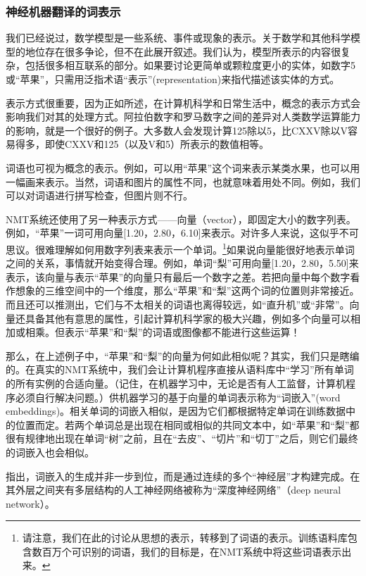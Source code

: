 \documentclass[output=paper]{langscibook}
\begin{document}
\subsubsection{神经机器翻译的词表示}\largerpage
我们已经说过，数学模型是一些系统、事件或现象的表示。关于数学和其他科学模型的地位存在很多争论，但不在此展开叙述。我们认为，模型所表示的内容很复杂，包括很多相互联系的部分。如果要讨论更简单或颗粒度更小的实体，如数字5或“苹果”，只需用泛指术语“表示”(representation)来指代描述该实体的方式。

表示方式很重要，因为正如\citet{deeplearningbook}所述，在计算机科学和日常生活中，概念的表示方式会影响我们对其的处理方式。阿拉伯数字和罗马数字之间的差异对人类数学运算能力的影响，就是一个很好的例子。大多数人会发现计算125除以5，比CXXV除以V容易得多，即使CXXV和125（以及V和5）所表示的数值相等。

词语也可视为概念的表示。例如，可以用“苹果”这个词来表示某类水果，也可以用一幅画来表示。当然，词语和图片的属性不同，也就意味着用处不同。例如，我们可以对词语进行拼写检查，但图片则不行。

NMT系统还使用了另一种表示方式——向量（vector），即固定大小的数字列表。例如，“苹果”一词可用向量[1.20，2.80，6.10]来表示。对许多人来说，这似乎不可思议。很难理解如何用数字列表来表示一个单词。\footnote{请注意，我们在此的讨论从思想的表示，转移到了词语的表示。训练语料库包含数百万个可识别的词语，我们的目标是，在NMT系统中将这些词语表示出来。}如果说向量能很好地表示单词之间的关系，事情就开始变得合理。例如，单词“梨”可用向量[1.20，2.80，5.50]来表示，该向量与表示“苹果”的向量只有最后一个数字之差。若把向量中每个数字看作想象的三维空间中的一个维度，那么“苹果”和“梨”这两个词的位置则非常接近。而且还可以推测出，它们与不太相关的词语也离得较远，如“直升机”或“非常”。向量还具备其他有意思的属性，引起计算机科学家的极大兴趣，例如多个向量可以相加或相乘。但表示“苹果”和“梨”的词语或图像都不能进行这些运算！

那么，在上述例子中，“苹果”和“梨”的向量为何如此相似呢？其实，我们只是瞎编的。在真实的NMT系统中，我们会让计算机程序直接从语料库中“学习”所有单词的所有实例的合适向量。（记住，在机器学习中，无论是否有人工监督，计算机程序必须自行解决问题。）供机器学习的基于向量的单词表示称为“词嵌入”(word embeddings)。相关单词的词嵌入相似，是因为它们都根据特定单词在训练数据中的位置而定。若两个单词总是出现在相同或相似的共同文本中，如“苹果”和“梨”都很有规律地出现在单词“树”之前，且在“去皮”、“切片”和“切丁”之后，则它们最终的词嵌入也会相似。

指出，词嵌入的生成并非一步到位，而是通过连续的多个“神经层”才构建完成。在其外层之间夹有多层结构的人工神经网络被称为“深度神经网络”（deep neural network）。
\end{document}
